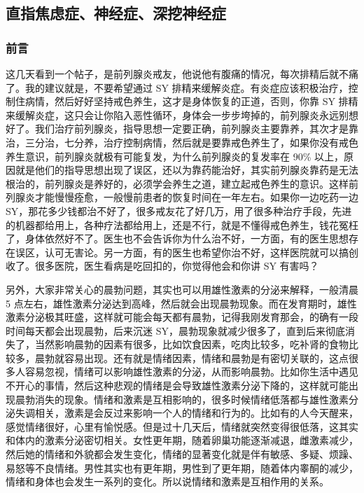 \documentclass[fontset=founder]{ctexart}
\begin{document}
\subsection{直指焦虑症、神经症、深挖神经症}

\subsubsection{前言}

这几天看到一个帖子，是前列腺炎戒友，他说他有腹痛的情况，每次排精后就不痛了。我的建议就是，不要希望通过 SY 排精来缓解炎症。有炎症应该积极治疗，控制住病情，然后好好坚持戒色养生，这才是身体恢复的正道，否则，你靠 SY 排精来缓解炎症，这只会让你陷入恶性循环，身体会一步步垮掉的，前列腺炎永远别想好了。我们治疗前列腺炎，指导思想一定要正确，前列腺炎主要靠养，其次才是靠治，三分治，七分养，治疗控制病情，然后就是要靠戒色养生了，如果你没有戒色养生意识，前列腺炎就极有可能复发，为什么前列腺炎的复发率在 90\% 以上，原因就是他们的指导思想出现了误区，还以为靠药能治好，其实前列腺炎靠药是无法根治的，前列腺炎是养好的，必须学会养生之道，建立起戒色养生的意识。这样前列腺炎才能慢慢痊愈，一般慢前患者的恢复时间在一年左右。如果你一边吃药一边 SY，那花多少钱都治不好了，很多戒友花了好几万，用了很多种治疗手段，先进的机器都给用上，各种疗法都给用上，还是不行，就是不懂得戒色养生，钱花冤枉了，身体依然好不了。医生也不会告诉你为什么治不好，一方面，有的医生思想存在误区，认可无害论。另一方面，有的医生也希望你治不好，这样医院就可以搞创收了。很多医院，医生看病是吃回扣的，你觉得他会和你讲 SY 有害吗？

另外，大家非常关心的晨勃问题，其实也可以用雄性激素的分泌来解释，一般清晨 5 点左右，雄性激素分泌达到高峰，然后就会出现晨勃现象。而在发育期时，雄性激素分泌极其旺盛，这样就可能会每天都有晨勃，记得我刚发育那会，的确有一段时间每天都会出现晨勃，后来沉迷 SY，晨勃现象就减少很多了，直到后来彻底消失了，当然影响晨勃的因素有很多，比如饮食因素，吃肉比较多，吃补肾的食物比较多，晨勃就容易出现。还有就是情绪因素，情绪和晨勃是有密切关联的，这点很多人容易忽视，情绪可以影响雄性激素的分泌，从而影响晨勃。比如你生活中遇见不开心的事情，然后这种悲观的情绪是会导致雄性激素分泌下降的，这样就可能出现晨勃消失的现象。情绪和激素是互相影响的，很多时候情绪低落都与雄性激素分泌失调相关，激素是会反过来影响一个人的情绪和行为的。比如有的人今天醒来，感觉情绪很好，心里有愉悦感。但是过十几天后，情绪就突然变得很低落，这其实和体内的激素分泌密切相关。女性更年期，随着卵巢功能逐渐减退，雌激素减少，然后她的情绪和外貌都会发生变化，情绪的显著变化就是伴有敏感、多疑、烦躁、易怒等不良情绪。男性其实也有更年期，男性到了更年期，随着体内睾酮的减少，情绪和身体也会发生一系列的变化。所以说情绪和激素是互相作用的关系。
\end{document}

